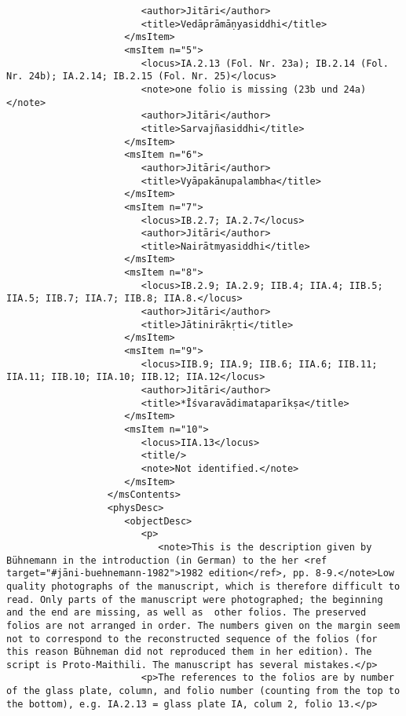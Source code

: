 \documentclass[article,12pt,a4paper]{memoir}%
\begin{document}
\begin{verbatim}
                        <author>Jitāri</author>
                        <title>Vedāprāmāṇyasiddhi</title>
                     </msItem>
                     <msItem n="5">
                        <locus>IA.2.13 (Fol. Nr. 23a); IB.2.14 (Fol. Nr. 24b); IA.2.14; IB.2.15 (Fol. Nr. 25)</locus>
                        <note>one folio is missing (23b und 24a)</note>
                        <author>Jitāri</author>
                        <title>Sarvajñasiddhi</title>
                     </msItem>
                     <msItem n="6">
                        <author>Jitāri</author>
                        <title>Vyāpakānupalambha</title>
                     </msItem>
                     <msItem n="7">
                        <locus>IB.2.7; IA.2.7</locus>
                        <author>Jitāri</author>
                        <title>Nairātmyasiddhi</title>
                     </msItem>
                     <msItem n="8">
                        <locus>IB.2.9; IA.2.9; IIB.4; IIA.4; IIB.5; IIA.5; IIB.7; IIA.7; IIB.8; IIA.8.</locus>
                        <author>Jitāri</author>
                        <title>Jātinirākṛti</title>
                     </msItem>
                     <msItem n="9">
                        <locus>IIB.9; IIA.9; IIB.6; IIA.6; IIB.11; IIA.11; IIB.10; IIA.10; IIB.12; IIA.12</locus>
                        <author>Jitāri</author>
                        <title>*Īśvaravādimataparīkṣa</title>
                     </msItem>
                     <msItem n="10">
                        <locus>IIA.13</locus>
                        <title/>
                        <note>Not identified.</note>
                     </msItem>
                  </msContents>
                  <physDesc>
                     <objectDesc>
                        <p>
                           <note>This is the description given by Bühnemann in the introduction (in German) to the her <ref target="#jāni-buehnemann-1982">1982 edition</ref>, pp. 8-9.</note>Low quality photographs of the manuscript, which is therefore difficult to read. Only parts of the manuscript were photographed; the beginning and the end are missing, as well as  other folios. The preserved folios are not arranged in order. The numbers given on the margin seem not to correspond to the reconstructed sequence of the folios (for this reason Bühneman did not reproduced them in her edition). The script is Proto-Maithili. The manuscript has several mistakes.</p>
                        <p>The references to the folios are by number of the glass plate, column, and folio number (counting from the top to the bottom), e.g. IA.2.13 = glass plate IA, colum 2, folio 13.</p>

\end{verbatim}
\end{document}

